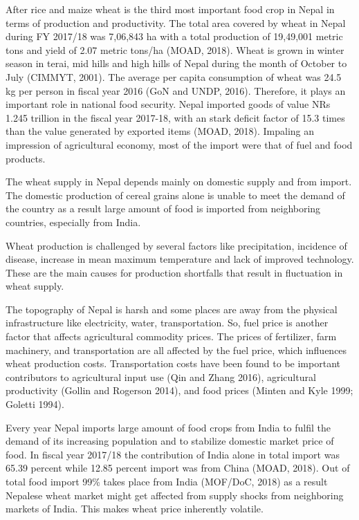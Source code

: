 \documentclass[12pt,]{article}
\begin{document}
After rice and maize wheat is the third most important food crop in Nepal in terms of production and productivity. The total area covered by wheat in Nepal during FY 2017/18 was 7,06,843 ha with a total production of 19,49,001 metric tons and yield of 2.07 metric tons/ha (MOAD, 2018). Wheat is grown in winter season in terai, mid hills and high hills of Nepal during the month of October to July (CIMMYT, 2001). The average per capita consumption of wheat was 24.5 kg per person in fiscal year 2016 (GoN and UNDP, 2016). Therefore, it plays an important role in national food security. Nepal imported goods of value NRs 1.245 trillion in the fiscal year 2017-18, with an stark deficit factor of 15.3 times than the value generated by exported items (MOAD, 2018). Impaling an impression of agricultural economy, most of the import were that of fuel and food products.

The wheat supply in Nepal depends mainly on domestic supply and from import. The domestic production of cereal grains alone is unable to meet the demand of the country as a result large amount of food is imported from neighboring countries, especially from India.

Wheat production is challenged by several factors like precipitation, incidence of disease, increase in mean maximum temperature and lack of improved technology. These are the main causes for production shortfalls that result in fluctuation in wheat supply.

The topography of Nepal is harsh and some places are away from the physical infrastructure like electricity, water, transportation. So, fuel price is another factor that affects agricultural commodity prices. The prices of fertilizer, farm machinery, and transportation are all affected by the fuel price, which influences wheat production costs. Transportation costs have been found to be important contributors to agricultural input use (Qin and Zhang 2016), agricultural productivity (Gollin and Rogerson 2014), and food prices (Minten and Kyle 1999; Goletti 1994).

Every year Nepal imports large amount of food crops from India to fulfil the demand of its increasing population and to stabilize domestic market price of food. In fiscal year 2017/18 the contribution of India alone in total import was 65.39 percent while 12.85 percent import was from China (MOAD, 2018). Out of total food import 99\% takes place from India (MOF/DoC, 2018) as a result Nepalese wheat market might get affected from supply shocks from neighboring markets of India. This makes wheat price inherently volatile.
\end{document}

